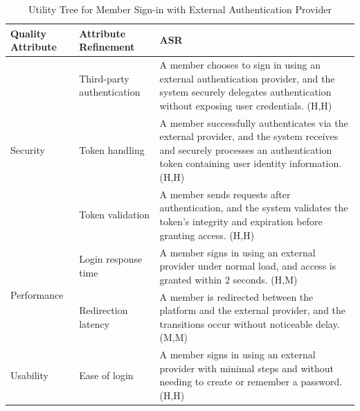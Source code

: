 \documentclass{article}
\begin{document}
\begin{table}[H]
    \centering
    \caption{Utility Tree for Member Sign-in with External Authentication Provider}
    \begin{tabular}{|p{3cm}|p{4cm}|p{7cm}|}
        \hline
        \textbf{Quality Attribute} & \textbf{Attribute Refinement}                                                                                                                                                     & \textbf{ASR} \\
        \hline

        \multirow{3}{*}{Security}
                                   & Third-party authentication
                                   & A member chooses to sign in using an external authentication provider, and the system securely delegates authentication without exposing user credentials. (H,H)                                 \\
        \cline{2-3}
                                   & Token handling
                                   & A member successfully authenticates via the external provider, and the system receives and securely processes an authentication token containing user identity information. (H,H)                \\
        \cline{2-3}
                                   & Token validation
                                   & A member sends requests after authentication, and the system validates the token’s integrity and expiration before granting access. (H,H)                                                        \\
        \hline

        \multirow{2}{*}{Performance}
                                   & Login response time
                                   & A member signs in using an external provider under normal load, and access is granted within 2 seconds. (H,M)                                                                                    \\
        \cline{2-3}
                                   & Redirection latency
                                   & A member is redirected between the platform and the external provider, and the transitions occur without noticeable delay. (M,M)                                                                 \\
        \hline

        Usability
                                   & Ease of login
                                   & A member signs in using an external provider with minimal steps and without needing to create or remember a password. (H,H)                                                                      \\
        \hline


\end{tabular}
\end{table}
\end{document}
